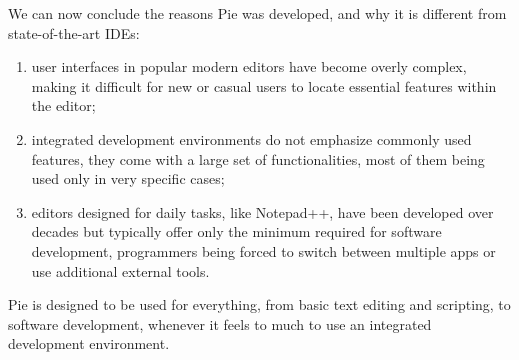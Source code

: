 We can now conclude the reasons Pie was developed, and why it is different from state-of-the-art IDEs:

\begin{enumerate}
  \item user interfaces in popular modern editors have become overly complex, making it difficult for new or casual users to locate essential features within the editor;
  \item integrated development environments do not emphasize commonly used features, they come with a large set of functionalities, most of them being used only in very specific cases;
  \item editors designed for daily tasks, like Notepad++, have been developed over decades but typically offer only the minimum required for software development, programmers being forced to switch between multiple apps or use additional external tools. 
\end{enumerate}

Pie is designed to be used for everything, from basic text editing and scripting, to software development, whenever it feels to much to use an integrated development environment.